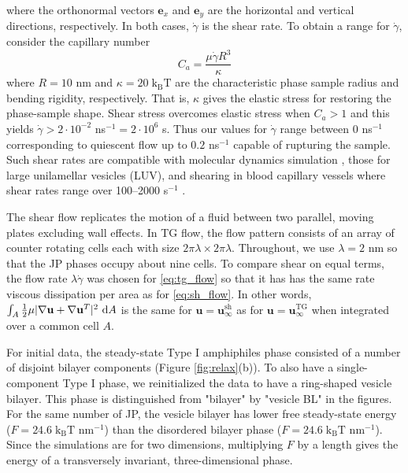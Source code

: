 \documentclass[prb,preprint,showpacs,preprintnumbers,amsmath,amssymb,longbibliography]{revtex4-1}
\newcommand{\ee}{\mathbf{e}}
\newcommand{\uu}{\mathbf{u}}
\newcommand{\kbt}{\mathrm{k}_{\text{B}}\mathrm{T}}
\begin{document}
where the orthonormal vectors $\ee_x$ and $\ee_y$ are the horizontal
and vertical directions, respectively. 
In both cases, $\dot \gamma$ is the shear rate.
To obtain a range for $\dot \gamma$, 
consider the capillary number 
\begin{equation}
\label{eq:capillary}
C_a = \frac{\mu \dot \gamma R^3}{\kappa}
\end{equation}
where $R = 10$ nm and $\kappa = 20\;\kbt$ are 
the characteristic phase sample radius 
and bending rigidity, respectively. 
That is, $\kappa$ gives the elastic stress 
for restoring the phase-sample shape.
Shear stress overcomes elastic stress   
when $C_a > 1$ and this yields 
$\dot \gamma > 2 \cdot 10^{-2}$ ns$^{-1} = 2 \cdot 10^6$ s.
Thus our values for $\dot \gamma$ range between 
$0$ ns$^{-1}$ corresponding to quiescent flow
up to $0.2$ ns$^{-1}$ capable of rupturing the sample. 
Such shear rates are compatible with molecular dynamics 
simulation \cite{Brandner2019}, those for large unilamellar vesicles (LUV),
\cite{Bernard2005ShearinducedPA} and shearing in blood capillary vessels 
 where shear rates range over 100--2000 s$^{-1}$ \cite{Cho2011}.


The shear flow replicates the motion of a fluid between two parallel, moving plates
excluding wall effects.  In TG flow, the flow pattern
consists of an array of counter rotating cells each with size 
$2\pi \lambda \times 2\pi \lambda$.  Throughout, we use $\lambda = 2$ nm
so that the JP phases occupy about nine cells.  To compare shear
on equal terms, the flow rate $\lambda \dot \gamma$  
was chosen for \eqref{eq:tg_flow} so that it has has the same
rate viscous dissipation per area as for \eqref{eq:sh_flow}.
In other words, 
$\int_{A} \frac{1}{2}\mu |\nabla \uu + \nabla \uu^T|^2 \,\dif A$ 
is the same for 
$\uu = \uu_{\infty}^{\text{sh}}$ as for 
$\uu = \uu_{\infty}^{\text{TG}}$
when integrated over a common cell $A$. 


For initial data, the steady-state Type I amphiphiles phase
consisted of a number of disjoint bilayer components
(Figure \ref{fig:relax}(b)). To also have a single-component Type I phase, 
we reinitialized the data to have a ring-shaped vesicle bilayer.
This phase is distinguished from "bilayer" by "vesicle BL" in the figures.
For the same number of JP, the vesicle bilayer
has lower free  steady-state energy ($F = 24.6 \;\kbt$ nm$^{-1}$) than the 
disordered bilayer phase ($F = 24.6 \;\kbt$ nm$^{-1}$). 
Since the simulations are for two dimensions,
multiplying $F$ by a length gives the energy 
of a transversely invariant, three-dimensional 
phase.
\end{document}
